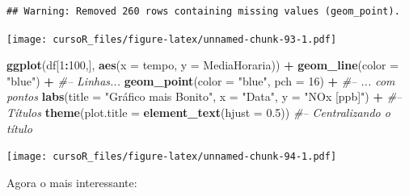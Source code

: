 \documentclass[]{book}
\newenvironment{Shaded}{\begin{snugshade}}{\end{snugshade}}
\newcommand{\KeywordTok}[1]{\textcolor[rgb]{0.13,0.29,0.53}{\textbf{#1}}}
\newcommand{\DataTypeTok}[1]{\textcolor[rgb]{0.13,0.29,0.53}{#1}}
\newcommand{\DecValTok}[1]{\textcolor[rgb]{0.00,0.00,0.81}{#1}}
\newcommand{\FloatTok}[1]{\textcolor[rgb]{0.00,0.00,0.81}{#1}}
\newcommand{\StringTok}[1]{\textcolor[rgb]{0.31,0.60,0.02}{#1}}
\newcommand{\CommentTok}[1]{\textcolor[rgb]{0.56,0.35,0.01}{\textit{#1}}}
\newcommand{\OperatorTok}[1]{\textcolor[rgb]{0.81,0.36,0.00}{\textbf{#1}}}
\newcommand{\NormalTok}[1]{#1}
\theoremstyle{definition}
\theoremstyle{definition}
\theoremstyle{definition}
\theoremstyle{remark}
\begin{document}
\begin{verbatim}
## Warning: Removed 260 rows containing missing values (geom_point).
\end{verbatim}

\texttt{[image: cursoR\_files/figure-latex/unnamed-chunk-93-1.pdf]}

\begin{Shaded}
\begin{Highlighting}[]
\KeywordTok{ggplot}\NormalTok{(df[}\DecValTok{1}\OperatorTok{:}\DecValTok{100}\NormalTok{,], }\KeywordTok{aes}\NormalTok{(}\DataTypeTok{x =}\NormalTok{ tempo, }\DataTypeTok{y =}\NormalTok{ MediaHoraria)) }\OperatorTok{+}\StringTok{ }
\StringTok{  }\KeywordTok{geom_line}\NormalTok{(}\DataTypeTok{color =} \StringTok{"blue"}\NormalTok{) }\OperatorTok{+}\StringTok{ }\CommentTok{#-- Linhas...}
\StringTok{  }\KeywordTok{geom_point}\NormalTok{(}\DataTypeTok{color =} \StringTok{"blue"}\NormalTok{, }\DataTypeTok{pch =} \DecValTok{16}\NormalTok{) }\OperatorTok{+}\StringTok{ }\CommentTok{#-- ... com pontos}
\StringTok{  }\KeywordTok{labs}\NormalTok{(}\DataTypeTok{title =} \StringTok{"Gráfico mais Bonito"}\NormalTok{, }\DataTypeTok{x =} \StringTok{"Data"}\NormalTok{, }\DataTypeTok{y =} \StringTok{"NOx [ppb]"}\NormalTok{) }\OperatorTok{+}\StringTok{ }\CommentTok{#-- Títulos}
\StringTok{  }\KeywordTok{theme}\NormalTok{(}\DataTypeTok{plot.title =} \KeywordTok{element_text}\NormalTok{(}\DataTypeTok{hjust =} \FloatTok{0.5}\NormalTok{)) }\CommentTok{#-- Centralizando o título}
\end{Highlighting}
\end{Shaded}

\texttt{[image: cursoR\_files/figure-latex/unnamed-chunk-94-1.pdf]}

Agora o mais interessante:
\end{document}
